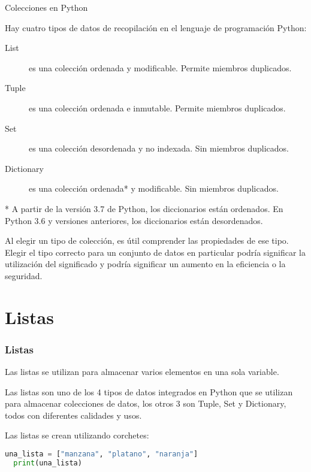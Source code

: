 
\begin{frame}[c]{Colecciones en Python}

  Hay cuatro tipos de datos de recopilación en el lenguaje de programación Python:

  \pausa
  \begin{description}
    \item[List ] es una colección ordenada y modificable.
      Permite miembros duplicados.
    \pausa
    \item[Tuple ] es una colección ordenada e inmutable.
      Permite miembros duplicados.
    \pausa
    \item[Set ] es una colección desordenada y no indexada.
      Sin miembros duplicados.
    \pausa
    \item[Dictionary ] es una colección ordenada* y modificable.
      Sin miembros duplicados.
  \end{description}

  \begin{exampleblock}{}
    * A partir de la versión 3.7 de Python, los diccionarios están ordenados.
    En Python 3.6 y versiones anteriores, los diccionarios están desordenados.
  \end{exampleblock}

  Al elegir un tipo de colección, es útil comprender las propiedades de ese
  tipo. Elegir el tipo correcto para un conjunto de datos en particular
  podría significar la utilización del significado y podría significar un
  aumento en la eficiencia o la seguridad. 
\end{frame}

\section{Listas}

\begin{frame}[fragile]
  \frametitle{Listas}

  \vspace{\baselineskip}
  Las listas se utilizan para almacenar varios elementos en una sola variable.

  \vspace{\baselineskip}
  Las listas son uno de los 4 tipos de datos integrados en Python que se
  utilizan para almacenar colecciones de datos, los otros 3 son Tuple,
  Set y Dictionary, todos con diferentes calidades y usos.

  \vspace{\baselineskip}
  Las listas se crean utilizando corchetes:

  \vspace{\baselineskip}
  \begin{lstlisting}[language=Python]
  una_lista = ["manzana", "platano", "naranja"]
  print(una_lista) 
  \end{lstlisting}
\end{frame}

